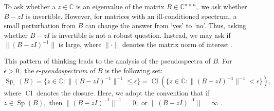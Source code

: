 








To ask whether a $z\in \mathbb{C}$ is an eigenvalue of the matrix $B \in \mathbb{C}^{n \times n},$ we ask whether $B-zI$ is invertible. However, for matrices with an ill-conditioned spectrum, a small perturbation from $B$ can change the answer from `yes' to `no'. Thus, asking whether $B-zI$ is invertible is not a robust question. Instead, we may ask if $\|(B-zI)^{-1}\|$ is large, where $\|\cdot\|$ denotes the matrix norm of interest \cite[Section~1.2]{Nick}.  

This pattern of thinking leads to the analysis of the pseudospectra of $B.$ For $\epsilon > 0,$ the $\epsilon$-\textit{pseudospectrum} of $B$ is the following set:
\begin{equation} \label{eps B}
    \operatorname{Sp}_{\epsilon}(B) = \{z \in \mathbb{C}:\|(B-zI)^{-1} \|^{-1} \le \epsilon \} = \operatorname{Cl} \left(\{z \in \mathbb{C} : \|(B-zI)^{-1} \|^{-1} < \epsilon \} \right),
\end{equation}
where $\operatorname{Cl}$ denotes the closure. Here, we adopt the convention that if $z \in \operatorname{Sp}(B),$ then $\|(B-zI)^{-1}\|^{-1} = 0,$ or $\|(B-zI)^{-1}\| = \infty$ \cite[Section~1.1.4]{Matt}. 

